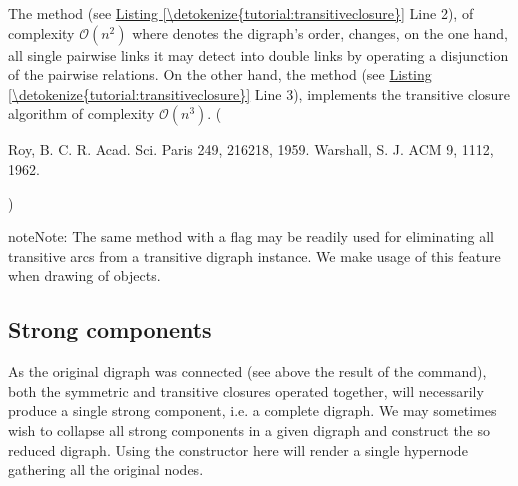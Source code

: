 \documentclass[a4paper,12pt,english]{sphinxhowto}
\begin{document}
The  method (see \hyperref[\detokenize{tutorial:transitiveclosure}]{Listing \ref{\detokenize{tutorial:transitiveclosure}}} Line 2), of complexity \(\mathcal{O}(n^2)\) where  denotes the digraph’s order, changes, on the one hand, all single pairwise links it may detect into double links by operating a disjunction of the pairwise relations. On the other hand, the  method (see \hyperref[\detokenize{tutorial:transitiveclosure}]{Listing \ref{\detokenize{tutorial:transitiveclosure}}} Line 3), implements the  transitive closure algorithm of complexity \(\mathcal{O}(n^3)\). (%
\begin{footnote}[17]\sphinxAtStartFootnote
Roy, B.  C. R. Acad. Sci. Paris 249, 216\sphinxhyphen{}218, 1959. Warshall, S.  J. ACM 9, 11\sphinxhyphen{}12, 1962.
%
\end{footnote})

\begin{sphinxadmonition}{note}{Note:}
The same  method with a  flag may be readily used for eliminating all transitive arcs from a transitive digraph instance. We make usage of this feature when drawing  of  objects.
\end{sphinxadmonition}


\subsection{Strong components}
\label{\detokenize{tutorial:strong-components}}
As the original digraph  was connected (see above the result of the  command), both the symmetric and transitive closures operated together, will necessarily produce a single strong component, i.e. a complete digraph. We may sometimes wish to collapse all strong components in a given digraph and construct the so reduced digraph. Using the  constructor here will render a single hyper\sphinxhyphen{}node gathering all the original nodes.
\end{document}
